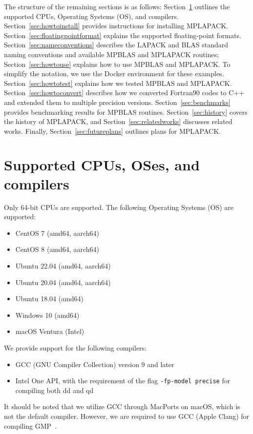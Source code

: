 \documentclass[12pt]{article}
\begin{document}
The structure of the remaining sections is as follows: Section~\ref{sec:supportedcpu} outlines the supported CPUs, Operating Systems (OS), and compilers. Section~\ref{sec:howtoinstall} provides instructions for installing MPLAPACK. Section~\ref{sec:floatingpointformat} explains the supported floating-point formats. Section~\ref{sec:nameconventions} describes the LAPACK and BLAS standard naming conventions and available MPBLAS and MPLAPACK routines; Section~\ref{sec:howtouse} explains how to use MPBLAS and MPLAPACK. To simplify the notation, we use the Docker environment for these examples.
Section~\ref{sec:howtotest} explains how we tested MPBLAS and MPLAPACK.
Section~\ref{sec:howtoconvert} describes how we converted Fortran90 codes to C++ and extended them to multiple precision versions. Section~\ref{sec:benchmarks} provides benchmarking results for MPBLAS routines. Section~\ref{sec:history} covers the history of MPLAPACK, and Section~\ref{sec:relatedworks} discusses related works. Finally, Section~\ref{sec:futureplans} outlines plans for MPLAPACK.

\section{Supported CPUs, OSes, and compilers}
\label{sec:supportedcpu}
Only 64-bit CPUs are supported. The following Operating Systems (OS) are supported:

\begin{itemize}
\item CentOS 7 (amd64, aarch64)
\item CentOS 8 (amd64, aarch64)
\item Ubuntu 22.04 (amd64, aarch64)
\item Ubuntu 20.04 (amd64, aarch64)
\item Ubuntu 18.04 (amd64)
\item Windows 10 (amd64)
\item macOS Ventura (Intel)
\end{itemize}

We provide support for the following compilers:
\begin{itemize}
\item GCC (GNU Compiler Collection) version 9 and later
\item Intel One API, with the requirement of the flag {\tt -fp-model precise} for compiling both dd and qd
\end{itemize}
It should be noted that we utilize GCC through MacPorts on macOS, which is not the default compiler. However, we are required to use GCC (Apple Clang) for compiling GMP~\cite{macosgccbug}.
\end{document}
